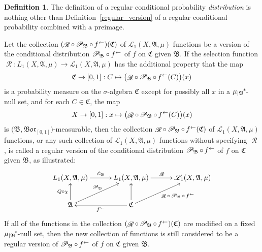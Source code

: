 \documentclass[
twoside=true,
paper=letter,
fontsize=9pt,
pagesize=auto,
leqno,
openany,
headsepline,
overfullrule,
]{scrbook}
\theoremstyle{plain}
\theoremstyle{plain}
\theoremstyle{definition}
\theoremstyle{bfnoteitalic}
\theoremstyle{bfnoteroman}
\newtheorem{defnboldnote}[thm]{Definition}
\newcommand{\sigalg}[1]{\mathfrak{#1}}
\newcommand{\cali}[1]{\mathscr{#1}}
\newcommand{\condexpop}[1]{\mathop{\cali{E}\hspace{-1pt}}\nolimits_{#1}}
\newcommand{\condprobop}[1]{\mathop{\cali{P}\hspace{-1pt}}\nolimits_{#1}}
\newcommand{\borel}{\mathfrak{Bor}}
\newcommand{\textsigma}{\hbox{\large{$\sigma$}}\kern-1pt}
\newcommand{\restrictedto}[1]{_{\lvert#1}\kern-1.5pt}
\newcommand{\preimage}[1]{\mathop{#1^{\leftarrow}}}
\newcommand{\sigmaalgebra}{\sigalg{A}}
\newcommand{\sigmaalgebraii}{\sigalg{B}}
\newcommand{\sigmaalgebraiii}{\sigalg{C}}
\newcommand{\kernast}{\ast\kern-1pt}
\newcommand{\Lone}{L_1(\measurespace, \sigmaalgebra, \measure)}
\newcommand{\caliLone}{\cali{L}_1(\measurespace, \sigmaalgebra, \measure)}
\newcommand{\function}{f}
\newcommand{\measurespace}{X}
\newcommand{\mspaceelt}{x}
\newcommand{\measure}{\mu}
\newcommand{\setiii}{C}
\newcommand{\regular}{\mathop{\cali{R}}}
\begin{document}
\begin{defnboldnote}\label{regular_conditional_distribution}
The definition of a
regular conditional probability \emph{distribution}
is nothing other than Definition~\ref{regular_version} of a regular conditional probability combined with a preimage.

Let the collection
$(\regular\circ\condprobop{\sigmaalgebraii}\circ\preimage{\function})
(\sigmaalgebraiii)$ of $\caliLone$ functions be a version of the conditional distribution
${\condprobop{\sigmaalgebraii}}\circ \preimage{\function}$ of $\function$ on $\sigmaalgebraiii$ given  
$\sigmaalgebraii$.
If the selection function 
$\regular:\Lone\to\caliLone$
has the additional property that the map
\[
\sigmaalgebraiii\to [0,1]: \setiii \mapsto 
\bigl( \regular\circ\condprobop{\sigmaalgebraii} \circ\preimage{\function}
(\setiii)\bigr)(\mspaceelt)
\]
is a probability measure on the \textsigma\hyp{}algebra $\sigmaalgebraiii$ except for possibly all
$\mspaceelt$ in a 
${\measure\restrictedto{\sigmaalgebraii}}^\kernast$-null set,
and for each
$\setiii\in\sigmaalgebraiii$, the map 
\[
\measurespace\to [0,1] : \mspaceelt\mapsto
\bigl( \regular\circ\condprobop{\sigmaalgebraii}\circ\preimage{\function}
(\setiii)\bigr)(\mspaceelt)
\]
is $\bigl(\sigmaalgebraii, \borel_{[0,1]}\bigr)$\hyp{}measurable,
then the collection 
$\regular\circ\condprobop{\sigmaalgebraii}\circ\preimage{\function}
(\sigmaalgebraiii)$ 
of 
$\caliLone$ functions, or any such collection of 
$\caliLone$ functions without specifying $\regular$,
is called a regular version of the conditional distribution 
$\condprobop{\sigmaalgebraii}\circ\preimage{\function}$ of $\function$ on 
$\sigmaalgebraiii$ given $\sigmaalgebraii$,
as illustrated:
\[
\xymatrix@C=30pt{ 
\Lone \ar[r]^{\condexpop{\sigmaalgebraii}} 
& \Lone \ar[r]^{\regular} & \caliLone
\\
\sigmaalgebra \ar[u]^-{Q\circ\chi} \ar[ur]^{\condprobop{\sigmaalgebraii}} 
& \sigmaalgebraiii 
\ar[l]^{\preimage{\function}} 
\ar[u]
\ar[ur]_{\regular
\makebox[0pt][l]{$\scriptstyle{\circ\condprobop{\sigmaalgebraii}\circ\preimage{\function}}$}
}
\\
}
\]
If all of the functions in the collection
$(\regular\circ\condprobop{\sigmaalgebraii}\circ\preimage{\function})
(\sigmaalgebraiii)$
are modified on a fixed
${\measure\restrictedto\sigmaalgebraii}^\kernast$-null set, then the new collection of functions is still considered to be a 
regular version of 
$\condprobop{\sigmaalgebraii}\circ\preimage{\function}$ 
of $\function$
on $\sigmaalgebraiii$ given $\sigmaalgebraii$.

\end{defnboldnote}
\end{document}
